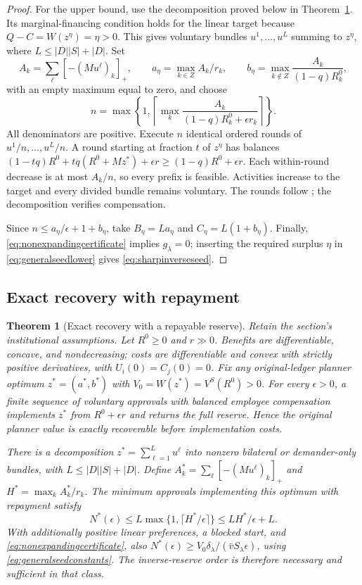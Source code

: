 \documentclass[ecta,draft,supplement]{econsocart}
\newtheorem{theorem}{Theorem}
\theoremstyle{definition}
\theoremstyle{definition}
\begin{document}
\begin{appendix}
\begin{proof}
For the upper bound, use the decomposition proved below in
Theorem~\ref{thm:temporaryreserve}. Its marginal-financing condition
holds for the linear target because $Q-C=W(z^\eta)=\eta>0$.
This gives voluntary bundles $u^1,\ldots,u^L$ summing to $z^\eta$,
where $L\leq|D||S|+|D|$. Set
\[
 A_k=\sum_\ell[-(Mu^\ell)_k]_+,\qquad
 a_\eta=\max_{k\in Z}A_k/r_k,\qquad
 b_\eta=\max_{k\notin Z}\frac{A_k}{(1-q)R_k^0},
\]
with an empty maximum equal to zero, and choose
\begin{equation}
 n=\max\left\{1,\left\lceil
       \max_k\frac{A_k}{(1-q)R_k^0+\epsilon r_k}
       \right\rceil\right\}.
 \label{eq:explicitseedrounds}
\end{equation}
All denominators are positive. Execute $n$ identical ordered rounds
of $u^1/n,\ldots,u^L/n$. A round starting at fraction $t$ of
$z^\eta$ has balances
$(1-tq)R^0+tq(R^0+Mz^*)+\epsilon r\geq(1-q)R^0+\epsilon r$.
Each within-round decrease is at most $A_k/n$, so every prefix is
feasible. Activities increase to the target and every divided bundle
remains voluntary. The rounds follow
\citet[Lemma~13]{FracaHaddad2015}; the decomposition verifies compensation.

Since $n\leq a_\eta/\epsilon+1+b_\eta$, take
$B_\eta=La_\eta$ and $C_\eta=L(1+b_\eta)$. Finally,
\eqref{eq:nonexpandingcertificate} implies $g_\lambda=0$;
inserting the required surplus $\eta$ in
\eqref{eq:generalseedlower} gives \eqref{eq:sharpinverseseed}.
\end{proof}

\subsection{Exact recovery with repayment}

\begin{theorem}[Exact recovery with a repayable reserve]
\label{thm:temporaryreserve}
Retain the section's institutional assumptions. Let $R^0\geq0$
and $r\gg0$. Benefits are differentiable, concave, and
nondecreasing; costs are differentiable and convex with strictly
positive derivatives, with $U_i(0)=C_j(0)=0$. Fix any original-ledger
planner optimum $z^*=(a^*,b^*)$ with
$V_0=W(z^*)=V^S(R^0)>0$.
For every $\epsilon>0$, a finite sequence of voluntary approvals
with balanced employee compensation implements $z^*$ from
$R^0+\epsilon r$ and returns the full reserve. Hence the original
planner value is exactly recoverable before implementation costs.

There is a decomposition $z^*=\sum_{\ell=1}^Lu^\ell$ into
nonzero bilateral or demander-only bundles, with
$L\leq|D||S|+|D|$. Define
$A_k^*=\sum_\ell[-(Mu^\ell)_k]_+$ and
$H^*=\max_k A_k^*/r_k$. The minimum approvals implementing this
optimum with repayment satisfy
\[
 N^*(\epsilon)\leq L\max\{1,\lceil H^*/\epsilon\rceil\}
                  \leq LH^*/\epsilon+L.
\]
With additionally positive linear preferences, a blocked start,
and \eqref{eq:nonexpandingcertificate}, also
$N^*(\epsilon)\geq V_0\delta_\lambda/(\bar vS_\lambda\epsilon)$,
using \eqref{eq:generalseedconstants}. The inverse-reserve order is
therefore necessary and sufficient in that class.
\end{theorem}


\end{appendix}
\end{document}
